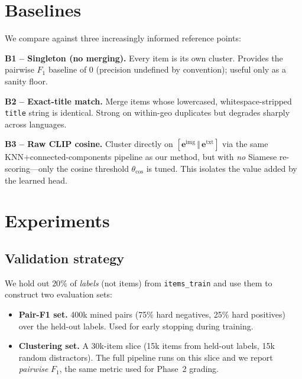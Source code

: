 \documentclass[10pt,conference]{IEEEtran}
\begin{document}
\section{Baselines}
\label{sec:baselines}

We compare against three increasingly informed reference points:

\textbf{B1 -- Singleton (no merging).} Every item is its own cluster.
Provides the pairwise $F_1$ baseline of $0$ (precision undefined by
convention); useful only as a sanity floor.

\textbf{B2 -- Exact-title match.} Merge items whose lowercased,
whitespace-stripped \texttt{title} string is identical. Strong on within-geo
duplicates but degrades sharply across languages.

\textbf{B3 -- Raw CLIP cosine.} Cluster directly on
$[\mathbf{e}^{\text{img}}\,\Vert\,\mathbf{e}^{\text{txt}}]$ via the same
KNN+connected-components pipeline as our method, but with \emph{no} Siamese
re-scoring---only the cosine threshold $\theta_\text{cos}$ is tuned. This
isolates the value added by the learned head.

\section{Experiments}
\label{sec:experiments}

\subsection{Validation strategy}
We hold out $20\%$ of \emph{labels} (not items) from \texttt{items\_train}
and use them to construct two evaluation sets:
\begin{itemize}
\item \textbf{Pair-F1 set.} 400k mined pairs (75\% hard negatives, 25\% hard
positives) over the held-out labels. Used for early stopping during training.
\item \textbf{Clustering set.} A 30k-item slice (15k items from held-out
labels, 15k random distractors). The full pipeline runs on this slice and we
report \emph{pairwise} $F_1$, the same metric used for Phase~2 grading.
\end{itemize}
\end{document}
